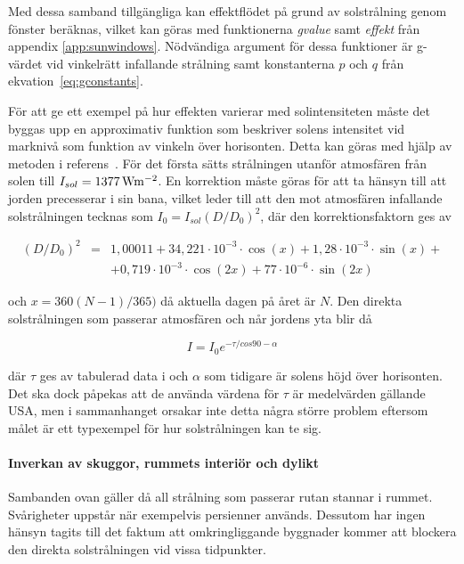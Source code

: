 Med dessa samband tillgängliga kan effektflödet på grund av solstrålning genom fönster beräknas, vilket kan göras med funktionerna \textit{gvalue} samt \textit{effekt} från appendix \ref{app:sunwindows}. Nödvändiga argument för dessa funktioner är g-värdet vid vinkelrätt infallande strålning samt konstanterna $p$ och $q$ från ekvation~\eqref{eq:gconstants}. %

För att ge ett exempel på hur effekten varierar med solintensiteten måste det byggas upp en approximativ funktion som beskriver solens intensitet vid marknivå som funktion av vinkeln över horisonten. Detta kan göras med hjälp av metoden i referens~\cite{ozel11}. För det första sätts strålningen utanför atmosfären från solen till $I_{sol}=\unit[1377]{Wm^{-2}}$. En korrektion måste göras för att ta hänsyn till att jorden precesserar i sin bana, vilket leder till att den mot atmosfären infallande solstrålningen tecknas som $I_0 = I_{sol}\left( D/D_0\right)^2$, där den korrektionsfaktorn ges av

\begin{align}
\left( D/D_0 \right)^2 & = & 1,00011 + 34,221\cdot 10^{-3}\cdot \cos{\left(x\right)} + 1,28\cdot 10^{-3}\cdot \sin{\left(x\right)} + \nonumber\\
&& + 0,719\cdot 10^{-3}\cdot \cos{\left(2x\right)} + 77\cdot 10^{-6}\cdot \sin{\left(2x\right)}
\end{align}

och $x = 360\left( N-1\right) /365)$ då aktuella dagen på året är $N$. Den direkta solstrålningen som passerar atmosfären och når jordens yta blir då

\begin{equation}
I = I_0e^{-\tau / cos{90-\alpha}}
\end{equation}

där $\tau$ ges av tabulerad data i \cite{ozel11} och $\alpha$ som tidigare är solens höjd över horisonten. Det ska dock påpekas att de använda värdena för $\tau$ är medelvärden gällande USA, men i sammanhanget orsakar inte detta några större problem eftersom målet är ett typexempel för hur solstrålningen kan te sig.

\paragraph{Inverkan av skuggor, rummets interiör och dylikt}

Sambanden ovan gäller då all strålning som passerar rutan stannar i rummet. Svårigheter uppstår när exempelvis persienner används. Dessutom har ingen hänsyn tagits till det faktum att omkringliggande byggnader kommer att blockera den direkta solstrålningen vid vissa tidpunkter.

